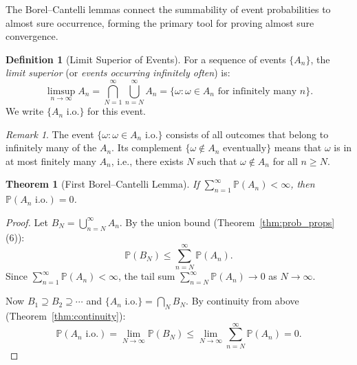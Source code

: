 \documentclass[11pt,a4paper]{article}
\theoremstyle{definition}
\newtheorem{definition}{Definition}[section]
\theoremstyle{plain}
\newtheorem{theorem}{Theorem}[section]
\theoremstyle{remark}
\newtheorem{remark}{Remark}[section]
\newcommand{\Prob}{\mathbb{P}}
\begin{document}
The Borel--Cantelli lemmas connect the summability of event probabilities to almost sure occurrence, forming the primary tool for proving almost sure convergence.

\begin{definition}[Limit Superior of Events]
\label{def:limsup_events}
For a sequence of events $\{A_n\}$, the \emph{limit superior} (or \emph{events occurring infinitely often}) is:
\begin{equation}
    \limsup_{n \to \infty} A_n = \bigcap_{N=1}^\infty \bigcup_{n=N}^\infty A_n = \{\omega : \omega \in A_n \text{ for infinitely many } n\}.
    \label{eq:limsup_events}
\end{equation}
We write $\{A_n \text{ i.o.}\}$ for this event.
\end{definition}

\begin{remark}
The event $\{\omega : \omega \in A_n \text{ i.o.}\}$ consists of all outcomes that belong to infinitely many of the $A_n$. Its complement $\{\omega \notin A_n \text{ eventually}\}$ means that $\omega$ is in at most finitely many $A_n$, i.e., there exists $N$ such that $\omega \notin A_n$ for all $n \geq N$.
\end{remark}

\begin{keyresult}
\begin{theorem}[First Borel--Cantelli Lemma]
\label{thm:bc1}
If $\sum_{n=1}^\infty \Prob(A_n) < \infty$, then $\Prob(A_n \text{ i.o.}) = 0$.
\end{theorem}
\end{keyresult}

\begin{proof}
Let $B_N = \bigcup_{n=N}^\infty A_n$. By the union bound (Theorem~\ref{thm:prob_props}(6)):
\begin{equation}
    \Prob(B_N) \leq \sum_{n=N}^\infty \Prob(A_n).
    \label{eq:bc1_step1}
\end{equation}
Since $\sum_{n=1}^\infty \Prob(A_n) < \infty$, the tail sum $\sum_{n=N}^\infty \Prob(A_n) \to 0$ as $N \to \infty$.

Now $B_1 \supseteq B_2 \supseteq \cdots$ and $\{A_n \text{ i.o.}\} = \bigcap_N B_N$. By continuity from above (Theorem~\ref{thm:continuity}):
\begin{equation}
    \Prob(A_n \text{ i.o.}) = \lim_{N \to \infty} \Prob(B_N) \leq \lim_{N \to \infty} \sum_{n=N}^\infty \Prob(A_n) = 0.
\end{equation}
\end{proof}
\end{document}
